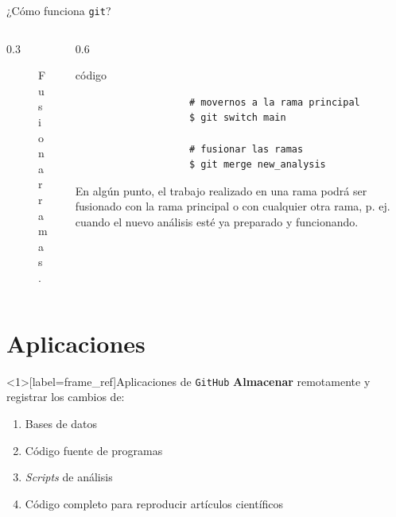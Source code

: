 \documentclass{beamer}
\begin{document}
\begin{frame}[fragile]{¿Cómo funciona \texttt{git}?}
    \begin{columns}
        \begin{column}{0.3\textwidth}
            \begin{figure}
                \centering
                
                \caption{Fusionar ramas.}
            \end{figure}
        \end{column}
        \begin{column}{0.6\textwidth}
            \begin{exampleblock}{código}
                \scriptsize
                \begin{verbatim}
                    # movernos a la rama principal
                    $ git switch main

                    # fusionar las ramas
                    $ git merge new_analysis
                \end{verbatim}
            \end{exampleblock}
            En algún punto, el trabajo realizado en una rama podrá ser fusionado con 
            la rama principal \textemdash o con cualquier otra rama\textemdash, p. ej.
            cuando el nuevo análisis esté ya preparado y funcionando.  
        \end{column}
    \end{columns}
\end{frame}


\section{Aplicaciones}

\begin{frame}<1>[label=frame_ref]{Aplicaciones de \texttt{GitHub}}
    \textbf{Almacenar} remotamente y registrar los cambios de:
    \begin{enumerate}
        \item<1-> Bases de datos
        \item<2-> Código fuente de programas
        \item<3-> \textit{Scripts} de análisis
        \item<4-> Código completo para reproducir artículos científicos
    \end{enumerate}
\end{frame}
\end{document}
